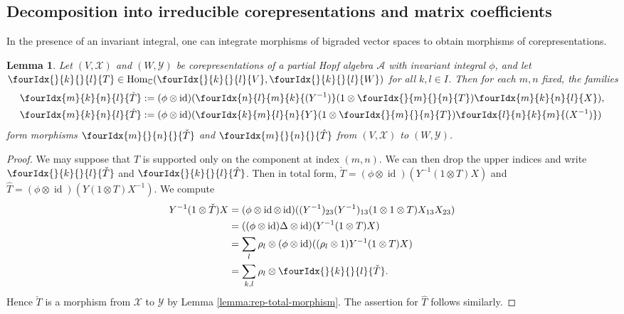 \documentclass[10pt]{article}
\DeclareMathOperator{\id}{id}
\DeclareMathOperator{\Hom}{Hom}
\newcommand{\C}{\mathbb{C}}
\newcommand{\Gr}[5]{\fourIdx{#2}{#4}{#3}{#5}{#1}}%
\newcommand{\Gru}[3]{\Gr{#1}{}{}{#2}{#3}}
\newcommand{\Grd}[3]{\Gr{#1}{#2}{#3}{}{}}
\newtheorem{Lem}[Theorem]{Lemma}
\theoremstyle{definition}
\numberwithin{equation}{section}
\begin{document}
\subsection{Decomposition into irreducible corepresentations and matrix coefficients}

In the presence of an invariant integral, one can integrate morphisms of bigraded vector spaces to obtain morphisms of corepresentations. 
\begin{Lem} \label{lem:rep-average}  Let $(V,\mathscr{X})$ and
  $(W,\mathscr{Y})$ be corepresentations of  a partial
  Hopf algebra $\mathscr{A}$ with invariant integral $\phi$, and let
  $\Gru{T}{k}{l} \in \Hom_{\C}(\Gru{V}{k}{l},\Gru{W}{k}{l})$ for all $k,l\in I$. Then for each $m,n$ fixed, the families
  \begin{align*}
    \Gr{\check T}{m}{n}{k}{l} &:= (\phi \otimes
    \id)(\Gr{(Y^{-1})}{n}{m}{l}{k}(1\otimes
    \Gru{T}{m}{n})\Gr{X}{m}{n}{k}{l}), \\
    \Gr{\hat T}{m}{n}{k}{l} &:=(\phi \otimes
    \id)(\Gr{Y}{k}{l}{m}{n}(1\otimes
    \Gru{T}{m}{n})\Gr{(X^{-1})}{l}{k}{n}{m})
  \end{align*} 
form  morphisms $\Grd{\check{T}}{m}{n}$ and $\Grd{\hat{T}}{m}{n}$ from $(V,\mathscr{X})$ to $(W,\mathscr{Y})$. 

\end{Lem} 
\begin{proof} We may suppose that $T$ is supported only on the component at index $(m,n)$. We can then drop the upper indices and write $\Gru{\check{T}}{k}{l}$ and $\Gru{\hat{T}}{k}{l}$. Then 
 in total form, $\check{T}=(\phi \otimes \id)(Y^{-1}(1 \otimes T)X)$
  and $\hat{T}=(\phi \otimes \id)(Y(1 \otimes T)X^{-1})$.  We compute
  \begin{align*}
    Y^{-1}(1 \otimes \check{T})X &= (\phi \otimes \id \otimes
    \id)((Y^{-1})_{23}(Y^{-1})_{13}(1 \otimes 1
    \otimes T)X_{13}X_{23})  \\
    &= ((\phi \otimes\id)  \Delta  \otimes \id)(Y^{-1}(1 \otimes T)X) \\
    &= \sum_{l} \rho_{l} \otimes (\phi \otimes \id)((\rho_{l} \otimes
    1)Y^{-1}(1 \otimes T)X)  \\
    &= \sum_{k,l} \rho_{l} \otimes \Gru{\check T}{k}{l}.
  \end{align*}
  Hence $\check{T}$ is a morphism from $\mathscr{X}$ to $\mathscr{Y}$
  by Lemma \ref{lemma:rep-total-morphism}. The assertion for $\hat
  T$ follows similarly.
\end{proof}
\end{document}
